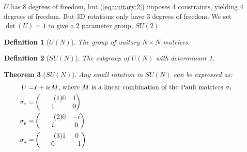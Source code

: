 \documentclass[]{article}
\newcommand\numberthis{\addtocounter{equation}{1}\tag{\theequation}}
\newtheorem{thm}{Theorem}
\newtheorem{defn}[thm]{Definition}
\begin{document}
$U$ has 8 degrees of freedom, but (\ref{eq:unitary:2}) imposes 4 constraints, yielding 4 degrees of freedom. But 3D rotations only have 3 degrees of freedom. We set $\det(U)=1$ to give a 2 parameter group, $SU(2)$

\begin{defn}[$U(N)$]
	The group of unitary $N\times N$ matrices.
\end{defn}

\begin{defn}[$SU(N)$]
	The subgroup of $U(N)$ with determinant 1.
\end{defn}

\begin{thm}[$SU(N)$]
	Any small rotation in $SU(N)$ can be expressed as:
	\begin{align*}
		U =& I + i \epsilon M \text{, where $M$ is a linear combination of the Pauli matrices $\sigma_i$}\\
		\sigma_x =& \begin{pmatrix} \numberthis \label{eq:pauli:x}
		0&1\\
		1&0
		\end{pmatrix}\\
		\sigma_y =& \begin{pmatrix} \numberthis \label{eq:pauli:y}
		0&-i\\
		i&0
		\end{pmatrix}\\
		\sigma_z =& \begin{pmatrix} \numberthis \label{eq:pauli:z}
		1&0\\
		0&-1
		\end{pmatrix}
	\end{align*}
\end{thm}
\end{document}
